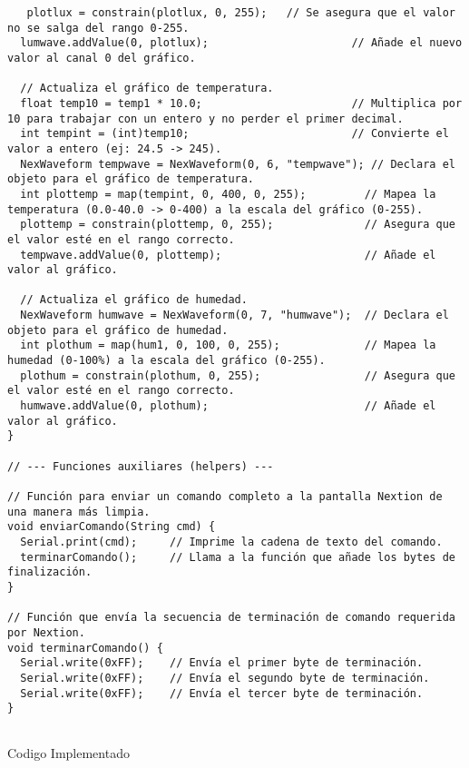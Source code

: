 \begin{listing}[H]
  \scriptsize
  \begin{verbatim}
   plotlux = constrain(plotlux, 0, 255);   // Se asegura que el valor no se salga del rango 0-255.
  lumwave.addValue(0, plotlux);                      // Añade el nuevo valor al canal 0 del gráfico.

  // Actualiza el gráfico de temperatura.
  float temp10 = temp1 * 10.0;                       // Multiplica por 10 para trabajar con un entero y no perder el primer decimal.
  int tempint = (int)temp10;                         // Convierte el valor a entero (ej: 24.5 -> 245).
  NexWaveform tempwave = NexWaveform(0, 6, "tempwave"); // Declara el objeto para el gráfico de temperatura.
  int plottemp = map(tempint, 0, 400, 0, 255);         // Mapea la temperatura (0.0-40.0 -> 0-400) a la escala del gráfico (0-255).
  plottemp = constrain(plottemp, 0, 255);              // Asegura que el valor esté en el rango correcto.
  tempwave.addValue(0, plottemp);                      // Añade el valor al gráfico.

  // Actualiza el gráfico de humedad.
  NexWaveform humwave = NexWaveform(0, 7, "humwave");  // Declara el objeto para el gráfico de humedad.
  int plothum = map(hum1, 0, 100, 0, 255);             // Mapea la humedad (0-100%) a la escala del gráfico (0-255).
  plothum = constrain(plothum, 0, 255);                // Asegura que el valor esté en el rango correcto.
  humwave.addValue(0, plothum);                        // Añade el valor al gráfico.
}

// --- Funciones auxiliares (helpers) ---

// Función para enviar un comando completo a la pantalla Nextion de una manera más limpia.
void enviarComando(String cmd) {
  Serial.print(cmd);     // Imprime la cadena de texto del comando.
  terminarComando();     // Llama a la función que añade los bytes de finalización.
}

// Función que envía la secuencia de terminación de comando requerida por Nextion.
void terminarComando() {
  Serial.write(0xFF);    // Envía el primer byte de terminación.
  Serial.write(0xFF);    // Envía el segundo byte de terminación.
  Serial.write(0xFF);    // Envía el tercer byte de terminación.
}


  \end{verbatim}
  \caption{Codigo Implementado}
  \label{lst:cod-1}
\end{listing}
